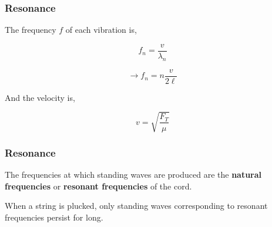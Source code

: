 \documentclass[]{beamer}
\begin{document}

\begin{frame}
\frametitle{Resonance}

The frequency $f$ of each vibration is,


\begin{equation}
f_n=\frac{v}{\lambda_n}
\end{equation}

\pause

\begin{equation}
\rightarrow f_n=n \frac{v}{2\ell}
\end{equation}

\pause

And the velocity is,


\begin{equation*}
v=\sqrt{\frac{F_T}{\mu}}
\end{equation*}

  \end{frame}



\begin{frame}
\frametitle{Resonance}




The frequencies at which standing waves are produced are the \textbf{natural frequencies}
or \textbf{resonant frequencies} of the cord.



When a  string is plucked, only standing waves corresponding to resonant frequencies persist for long.



  \end{frame}







\end{document}
